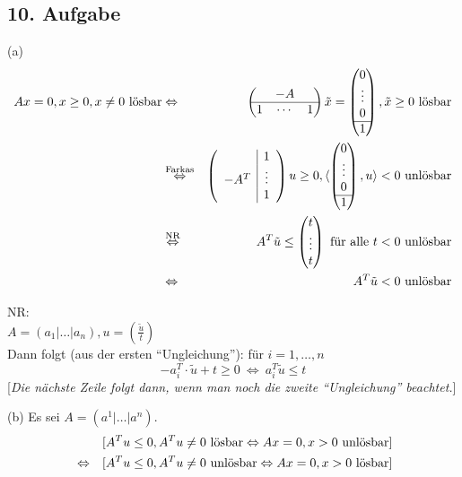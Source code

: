 \documentclass[a4paper,11pt,twoside,titlepage]{article}
\begin{document}
\subsection*{10. Aufgabe}
(a) \begin{eqnarray*}
Ax=0,x\geq0,x\neq0 \textnormal{ lösbar}&\Leftrightarrow&\begin{pmatrix}&-A&\\\hline1&\cdots&1\end{pmatrix}\tilde x=\begin{pmatrix}0\\\vdots\\0\\\hline1\end{pmatrix}, \tilde x\geq 0 \textnormal{ lösbar}\\
&\stackrel{\textnormal{\scriptsize{Farkas}}}{\Leftrightarrow}&\left(\begin{array}{c|c}&1\\-A^T&\vdots\\&1\end{array}\right)u\geq0, \langle\begin{pmatrix}0\\\vdots\\0\\\hline1\end{pmatrix},u\rangle <0 \textnormal{ unlösbar}\\
&\stackrel{\textnormal{\scriptsize{NR}}}{\Leftrightarrow}&A^T\tilde u\leq\begin{pmatrix}t\\\vdots\\t\end{pmatrix} \textnormal{ für alle \ensuremath{t<0} unlösbar}\\
&\Leftrightarrow&A^T\tilde u<0 \textnormal{ unlösbar}
\end{eqnarray*}

NR:\\
$A=(a_1|\ldots|a_n), u=\left(\frac{\tilde u}{t}\right)$\\
Dann folgt (aus der ersten "`Ungleichung"'): für $i=1,\ldots,n$
\[-a_i^T\cdot\tilde u+t\geq 0\ \Leftrightarrow\ a_i^T\tilde u\leq t\]
[\textit{Die nächste Zeile folgt dann, wenn man noch die zweite "`Ungleichung"' beachtet.}]

(b) Es sei $A=(a^1|\ldots|a^n)$.
\begin{eqnarray*}
&&[A^Tu\leq0,A^Tu\neq 0 \textnormal{ lösbar}\Leftrightarrow Ax=0,x>0 \textnormal{ unlösbar}]\\
&\Leftrightarrow&[A^Tu\leq0,A^Tu\neq 0 \textnormal{ unlösbar}\Leftrightarrow Ax=0,x>0 \textnormal{ lösbar}]
\end{eqnarray*}
\end{document}
